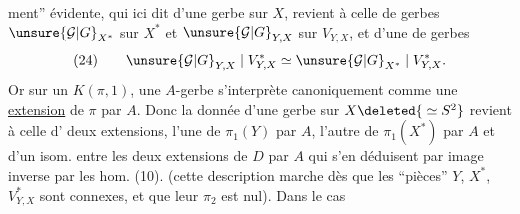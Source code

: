 ment'' évidente, qui ici dit 
d'une gerbe 
sur $X$, revient à celle de gerbes $\unsure{\mathcal G|G}_{X^*}$ sur
$X^*$ et $\unsure{\mathcal G|G}_{Y,X}$ sur $V_{Y,X}$, et d'une
 de  gerbes
\[
(24)\qquad \unsure{\mathcal G|G}_{Y,X}\mid V^*_{Y,X}\simeq
\unsure{\mathcal G|G}_{X^*}\mid V^*_{Y,X}.
\]
Or sur un $K(\pi,1)$, une $A$-gerbe
s'interprète canoniquement comme une
\uline{extension} de $\pi$ par $A$. Donc la donnée
d'une gerbe sur $X\deleted{{}\simeq S^2}$ revient à celle
d' deux extensions, l'une de
$\pi_1(Y)$ par $A$, l'autre de $\pi_1(X^*)$ par $A$
et d'un isom. entre les deux extensions
de $D$ par $A$ qui s'en déduisent
par image inverse par les hom. (10).
(cette description marche dès que les
``pièces'' $Y$, $X^*$, $V^*_{Y,X}$ sont connexes, et
que leur $\pi_2$ est nul). Dans le cas
